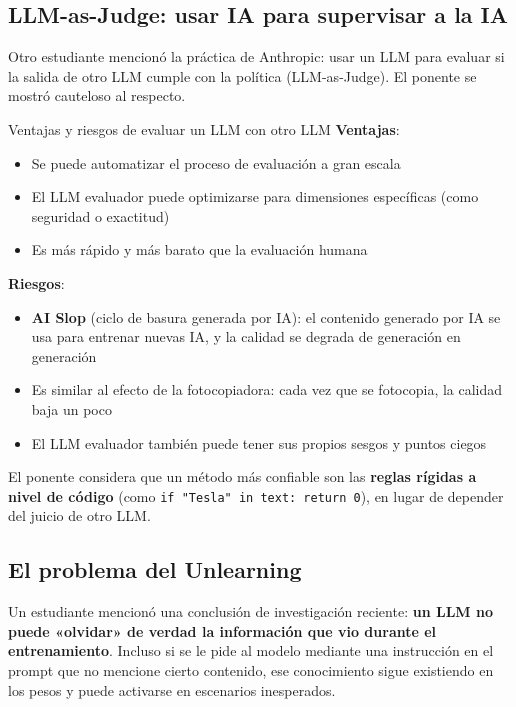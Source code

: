 \documentclass[a4paper]{article}
\begin{document}
\subsection{LLM-as-Judge: usar IA para supervisar a la IA}

Otro estudiante mencionó la práctica de Anthropic: usar un LLM para evaluar si la salida de otro LLM cumple con la política (LLM-as-Judge). El ponente se mostró cauteloso al respecto.

\begin{knowledgebox}{Ventajas y riesgos de evaluar un LLM con otro LLM}
\textbf{Ventajas}:
\begin{itemize}
    \item Se puede automatizar el proceso de evaluación a gran escala
    \item El LLM evaluador puede optimizarse para dimensiones específicas (como seguridad o exactitud)
    \item Es más rápido y más barato que la evaluación humana
\end{itemize}
\textbf{Riesgos}:
\begin{itemize}
    \item \textbf{AI Slop} (ciclo de basura generada por IA): el contenido generado por IA se usa para entrenar nuevas IA, y la calidad se degrada de generación en generación
    \item Es similar al efecto de la fotocopiadora: cada vez que se fotocopia, la calidad baja un poco
    \item El LLM evaluador también puede tener sus propios sesgos y puntos ciegos
\end{itemize}
El ponente considera que un método más confiable son las \textbf{reglas rígidas a nivel de código} (como \texttt{if "Tesla" in text: return 0}), en lugar de depender del juicio de otro LLM.
\end{knowledgebox}

\subsection{El problema del Unlearning}

Un estudiante mencionó una conclusión de investigación reciente: \textbf{un LLM no puede «olvidar» de verdad la información que vio durante el entrenamiento}. Incluso si se le pide al modelo mediante una instrucción en el prompt que no mencione cierto contenido, ese conocimiento sigue existiendo en los pesos y puede activarse en escenarios inesperados.
\end{document}
